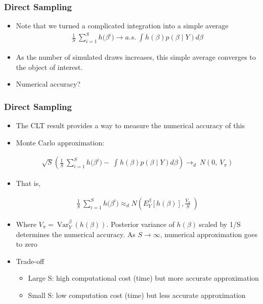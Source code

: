 \documentclass[
  shownotes,
  xcolor={svgnames},
  hyperref={colorlinks,citecolor=DarkBlue,linkcolor=DarkRed,urlcolor=DarkBlue}
  , aspectratio=169]{beamer}
\begin{document}
\begin{frame}[fragile]
\frametitle{Direct Sampling}


\begin{itemize}


\item Note that we turned a complicated integration into a simple average
\medskip
\begin{align}
\frac{1}{S}\ \sum_{i = 1}^{S}{h(\beta^{i}}) \rightarrow a.s.\ \int_{}^{}{h\left( \beta \right)p\left( \beta \middle| Y \right)d\beta}
\end{align}
\medskip
\item As the number of simulated draws increases, this simple average converges to the object of interest.
\medskip
\item Numerical accuracy?
\end{itemize}
\end{frame}
\begin{frame}[fragile]
\frametitle{Direct Sampling}

\begin{itemize}

\item The CLT result provides a way to measure the numerical accuracy of this
\medskip
\item Monte Carlo approximation:

\begin{align}
\sqrt{S}\left( \frac{1}{S}\ \sum_{i = 1}^{S}{h(\beta^{i}}) - \ \int_{}^{}{h\left( \beta \right)p\left( \beta \middle| Y \right)d\beta} \right) \rightarrow_{d}\ N(0,\ V_{\pi})
\end{align}


\item That is,

\begin{align}
\frac{1}{S}\ \sum_{i = 1}^{S}{h(\beta^{i}}) \approx_{d}N\left( E_{Y}^{\beta}\left\lbrack h\left( \beta \right) \right\rbrack,\frac{V_{\pi}}{S}\  \right)
\end{align}


\item Where $V_{\pi} = \ \text{Var}_{Y}^{\beta}\ (h\left( \beta \right))$. Posterior variance of $h\left( \beta \right)\ $scaled by 1/S determines the numerical accuracy. As $S \rightarrow \infty$, numerical approximation goes to zero

    \item Trade-off
    \begin{itemize}
        \item Large S: high computational cost (time) but more accurate approximation

        \item Small S: low computation cost (time) but less accurate approximation
    \end{itemize}
\end{itemize}
\end{frame}
\end{document}

